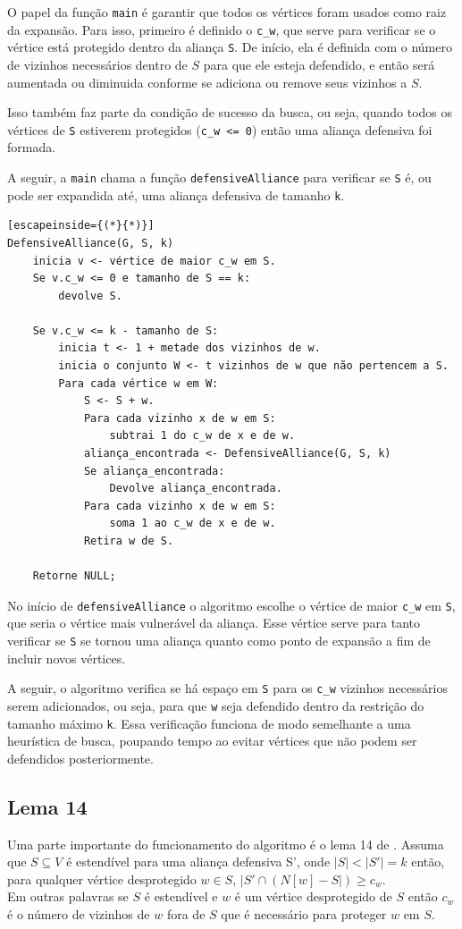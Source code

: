 O papel da função \texttt{main} é garantir que todos os vértices foram usados como raiz da expansão. Para isso, primeiro é definido o \texttt{c\_w}, que serve para verificar se o vértice está protegido dentro da aliança \texttt{S}. De início, ela é definida com o número de vizinhos necessários dentro de $S$ para que ele esteja defendido, e então será aumentada ou diminuida conforme se adiciona ou remove seus vizinhos a $S$.

Isso também faz parte da condição de sucesso da busca, ou seja, quando todos os vértices de \texttt{S} estiverem protegidos (\texttt{c\_w <= 0}) então uma aliança defensiva foi formada.

A seguir, a \texttt{main} chama a função \texttt{defensiveAlliance} para verificar se \texttt{S} é, ou pode ser expandida até, uma aliança defensiva de tamanho \texttt{k}.

\begin{lstlisting}[escapeinside={(*}{*)}]
DefensiveAlliance(G, S, k)
	inicia v <- vértice de maior c_w em S.
	Se v.c_w <= 0 e tamanho de S == k:
		devolve S.
		
	Se v.c_w <= k - tamanho de S: 
		inicia t <- 1 + metade dos vizinhos de w.
		inicia o conjunto W <- t vizinhos de w que não pertencem a S.
		Para cada vértice w em W:
			S <- S + w.
			Para cada vizinho x de w em S:
				subtrai 1 do c_w de x e de w.
			aliança_encontrada <- DefensiveAlliance(G, S, k)
			Se aliança_encontrada:
				Devolve aliança_encontrada.
			Para cada vizinho x de w em S:
				soma 1 ao c_w de x e de w.
			Retira w de S.
			
	Retorne NULL;
\end{lstlisting}

No início de \texttt{defensiveAlliance} o algoritmo escolhe o vértice de maior \texttt{c\_w} em \texttt{S},  que seria o vértice mais vulnerável da aliança. Esse vértice serve para tanto verificar se \texttt{S} se tornou uma aliança quanto como ponto de expansão a fim de incluir novos vértices.

A seguir, o algoritmo verifica se há espaço em \texttt{S} para os \texttt{c\_w} vizinhos necessários serem adicionados, ou seja, para que \texttt{w} seja defendido dentro da restrição do tamanho máximo \texttt{k}. Essa verificação funciona de modo semelhante a uma heurística de busca, poupando tempo ao evitar vértices que não podem ser defendidos posteriormente.

\subsection{Lema 14}
Uma parte importante do funcionamento do algoritmo é o lema 14 de \cite{Enciso2009}. Assuma que $S \subseteq V$ é estendível para uma aliança defensiva S', onde $|S| <|S'| = k$ então, para qualquer vértice desprotegido $w \in S$, $|S' \cap (N[w] - S|) \ge c_w$.\\
Em outras palavras se $S$ é estendível e $w$ é um vértice desprotegido de $S$ então $c_w$ é o número de vizinhos de $w$ fora de $S$ que é necessário para proteger $w$ em $S$.

